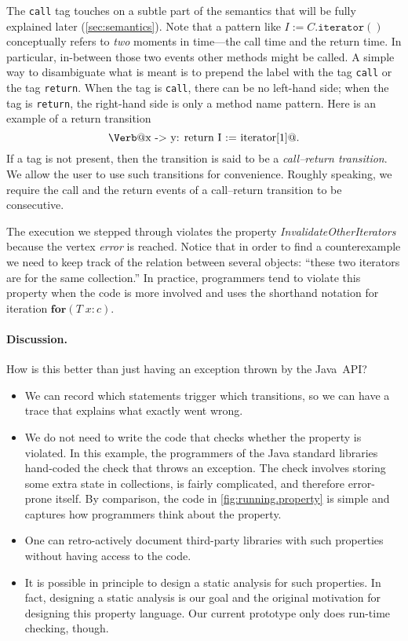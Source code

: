 \documentclass[preprint]{sigplanconf} %
\makeatletter
\newcommand{\verbline}[2][]{\[\text{\Verb@#2@}#1\]}
\theoremstyle{definition}
\makeatother
\begin{document}
The \texttt{call} tag touches on a subtle part of the semantics that will be fully explained later (\autoref{sec:semantics}).
Note that a pattern like $I:=C.\mathtt{iterator}()$ conceptually refers to \emph{two} moments in time---the call time and the return time.
In particular, in-between those two events other methods might be called.
A simple way to disambiguate what is meant is to prepend the label with the tag \texttt{call} or the tag \texttt{return}.
When the tag is \texttt{call}, there can be no left-hand side;
when the tag is \texttt{return}, the right-hand side is only a method name pattern.
Here is an example of a return transition \verbline[.]{x -> y: return I := iterator[1]}
If a tag is not present, then the transition is said to be a \emph{call--return transition}.
We allow the user to use such transitions for convenience.
Roughly speaking, we require the call and the return events of a call--return transition to be consecutive.

The execution we stepped through violates the property \textit{InvalidateOtherIterators} because the vertex \textit{error} is reached.
Notice that in order to find a counterexample we need to keep track of the relation between several objects: ``these two iterators are for the same collection.''
In practice, programmers tend to violate this property when the code is more involved and uses the shorthand notation for iteration $\mathbf{for}(T\;x:c)$.

\paragraph{Discussion.}
How is this better than just having an exception thrown by the Java~API\null?
\begin{itemize}
\item We can record which statements trigger which transitions, so we can have a trace that explains what exactly went wrong.
\item We do not need to write the code that checks whether the property is violated.
  In this example, the programmers of the Java standard libraries hand-coded the check that throws an exception.
  The check involves storing some extra state in collections, is fairly complicated, and therefore error-prone itself.
  By comparison, the code in \autoref{fig:running.property} is simple and captures how programmers think about the property.
\item One can retro-actively document third-party libraries with such properties without having access to the code.
\item It is possible in principle to design a static analysis for such properties.
  In fact, designing a static analysis is our goal and the original motivation for designing this property language.
  Our current prototype only does run-time checking, though.
\end{itemize}
\end{document}
